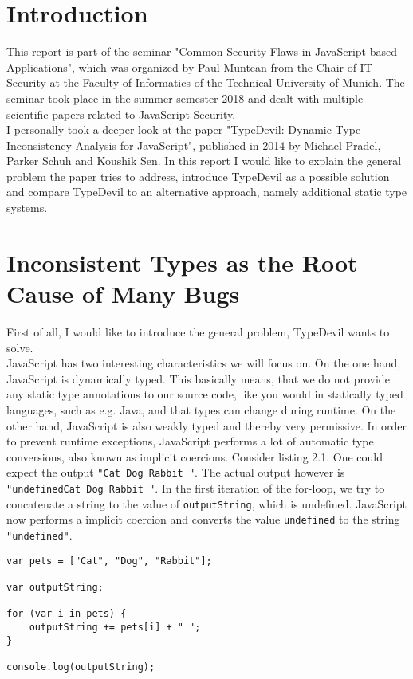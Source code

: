 \documentclass[runningheads,a4paper]{llncs}
\begin{document}
\section{Introduction}

This report is part of the seminar "Common Security Flaws in JavaScript based Applications", which was organized by Paul Muntean from the Chair of IT Security at the Faculty of Informatics of the Technical University of Munich.
The seminar took place in the summer semester 2018 and dealt with multiple scientific papers related to JavaScript Security. \\
I personally took a deeper look at the paper "TypeDevil: Dynamic Type Inconsistency Analysis for JavaScript", published in 2014 by Michael Pradel, Parker Schuh and Koushik Sen.
In this report I would like to explain the general problem the paper tries to address, introduce TypeDevil as a possible solution and compare TypeDevil to an alternative approach, namely additional static type systems. 

\section{Inconsistent Types as the Root Cause of Many Bugs}
First of all, I would like to introduce the general problem, TypeDevil wants to solve. \\
JavaScript has two interesting characteristics we will focus on. 
On the one hand, JavaScript is dynamically typed. This basically means, that we do not provide any static type annotations to our source code, like you would in statically typed languages, such as e.g. Java, and that types can change during runtime.
On the other hand, JavaScript is also weakly typed and thereby very permissive. In order to prevent runtime exceptions, JavaScript performs a lot of automatic type conversions, also known as implicit coercions.
Consider listing 2.1. One could expect the output \lstinline[columns=fixed]{"Cat Dog Rabbit "}.
The actual output however is \lstinline[columns=fixed]{"undefinedCat Dog Rabbit "}. 
In the first iteration of the for-loop, we try to concatenate a string to the value of \lstinline[columns=fixed]{outputString}, which is undefined. 
JavaScript now performs a implicit coercion and converts the value \lstinline[columns=fixed]{undefined} to the string \lstinline[columns=fixed]{"undefined"}.

\lstset{language=javascript}
\begin{minipage}{\linewidth}
\begin{lstlisting}[frame=single, caption=Implicit Coercions]
var pets = ["Cat", "Dog", "Rabbit"];

var outputString;

for (var i in pets) {
    outputString += pets[i] + " ";
}

console.log(outputString);
\end{lstlisting}
\end{minipage}
\end{document}

